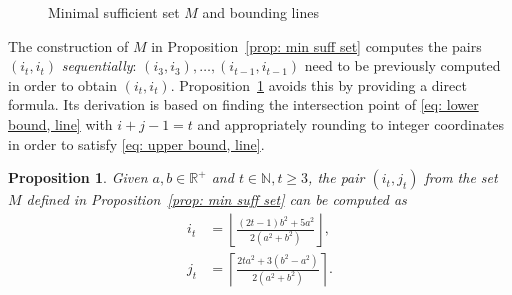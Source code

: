 \documentclass[12pt, a4paper]{article}
\newcommand{\tiles}{t} %
\newcommand{\mss}{M}
\newtheorem{proposition}{Proposition}%
\begin{document}
\begin{figure}
{}\hfill%
%
\caption{Minimal sufficient set $\mss$ and bounding lines
}%
\label{fig: pairs_bounds}%
\end{figure}%

The construction of $\mss$ in Proposition~\ref{prop: min suff set} computes the pairs $(i_\tiles,i_\tiles)$ \emph{sequentially}: $(i_3,i_3), \ldots, (i_{\tiles-1},i_{\tiles-1})$ need to be previously computed in order to obtain $(i_\tiles,i_\tiles)$. Proposition~\ref{prop: min suff set, form} avoids this by providing a direct formula. Its derivation is based on finding the intersection point of \eqref{eq: lower bound, line} with  $i+j-1=\tiles$ and appropriately rounding to integer coordinates in order to satisfy \eqref{eq: upper bound, line}.

\begin{proposition}
\label{prop: min suff set, form}
Given $a, b \in \mathbb R^+$ and $\tiles \in \mathbb N, \tiles \geq 3$, the pair $(i_\tiles,j_\tiles)$ from the set $\mss$ defined in Proposition~\ref{prop: min suff set} can be computed as
\begin{align}
\label{eq: min suff set, form, i}
i_\tiles &= \left\lfloor \frac {(2\tiles-1)b^2+5a^2}{2(a^2+b^2)} \right\rfloor, \\
\label{eq: min suff set, form, j}
j_\tiles &= \left\lceil \frac {2\tiles a^2 + 3(b^2-a^2)}{2(a^2+b^2)} \right\rceil. 
\end{align}
\end{proposition}
\end{document}
